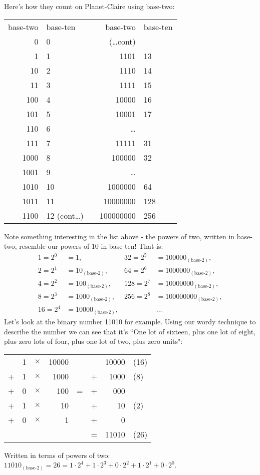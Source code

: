 \documentclass{article}
\begin{document}
Here's how they count on Planet-Claire using base-two:
\begin{center}
\begin{tabular}{r l c r l}
base-two & base-ten & \; \; \; \; & base-two & base-ten\\
0 & 0 & \phantom& (\dots cont)\\
1 & 1 & \phantom& 1101 & 13\\
10 & 2 & \phantom& 1110 & 14\\
11 & 3 & \phantom& 1111 & 15\\
100 & 4 & \phantom& 10000 & 16\\
101 & 5 & \phantom& 10001 & 17\\
110 & 6 & \phantom& \dots{}\\
111 & 7 & \phantom& 11111 & 31\\
1000 & 8 & \phantom& 100000 & 32\\
1001 & 9 & \phantom& \dots{}\\
1010 & 10 & \phantom & 1000000 & 64\\
1011 & 11 & \phantom& 10000000 & 128\\
1100 & 12 (cont\dots) & \phantom& 100000000 & 256
\end{tabular}
\end{center}
\break
Note something interesting in the list above - the powers of two,
written in base-two,
resemble our powers of 10 in base-ten! That is:
\begin{align*}
1 = 2^0&= 1, & 32 = 2^5&= 100000_{(\text{base-2})},\\
2 = 2^1&= 10_{(\text{base-2})}, & 64 = 2^6&= 1000000_{(\text{base-2})},\\
4 = 2^2&= 100_{(\text{base-2})}, & 128 = 2^7&= 10000000_{(\text{base-2})},\\
8 = 2^3&= 1000_{(\text{base-2})},& 256 = 2^8&= 100000000_{(\text{base-2})},\\
16 = 2^4&= 10000_{(\text{base-2})},& & \dots{}
\end{align*}
Let's look at the binary number 11010 for example.
Using our wordy technique to describe the number
we can see that it's ``One lot of sixteen,
plus one lot of eight, plus zero lots of four,
plus one lot of two, plus zero units": 
\begin{center}
\begin{tabular}{r r r r c r r l}
\phantom & 1 & $\times$ & 10000 & \phantom & \phantom & 10000 & (16)\\
+ & 1 & $\times$ & 1000 & \phantom & + & 1000 & (8)\\
+ & 0 & $\times$ & 100 & \; \; = \; \; & + & 000 & \\
+ & 1 & $\times$ & 10 & \phantom & + & 10 & (2)\\
+ & 0 & $\times$ & 1 & \phantom & + & 0\\
\cline{6-8}
\phantom & \phantom & \phantom & \phantom & \phantom & = & 11010 & (26)\\
\end{tabular}
\end{center}
Written in terms of powers of two:
$11010_{(\text{base-2})}=26=1\cdot2^4+1\cdot2^3+0\cdot2^2+1\cdot2^1+0\cdot2^0$.
\end{document}
